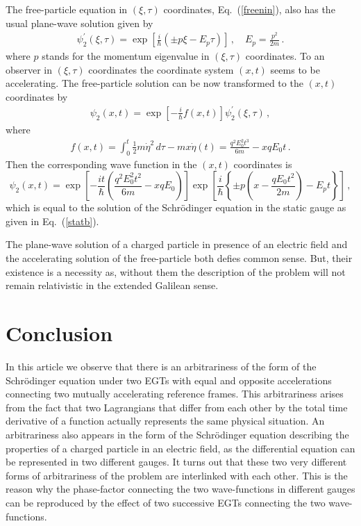 \documentclass[12pt]{article}
\begin{document}
The free-particle equation in $(\xi,\tau)$ coordinates, Eq.~(\ref{freenin}),
also has the usual plane-wave solution given by
%
\begin{eqnarray}
\psi_2^\prime(\xi,\tau)=
\exp\left[\frac{i}{\hbar}(\pm p\xi - E_p
  \tau)\right]\,,\,\,\,\,\,\,E_p=\frac{p^2}{2m}\,.
\end{eqnarray}
%
where $p$ stands for the momentum eigenvalue in $(\xi,\tau)$
coordinates.  To an observer in $(\xi,\tau)$ coordinates the
coordinate system $(x,t)$ seems to be accelerating. The free-particle
solution can be now transformed to the $(x,t)$ coordinates by
%
\begin{eqnarray}
\psi_2(x,t)=\exp\left[-\frac{i}{\hbar}f(x,t)\right]
\psi_2^\prime(\xi,\tau)\,,
\label{coor_gauge2} 
\end{eqnarray}
%
where 
%
\begin{eqnarray}
f(x, t)=\int_0^t \frac12
m\dot{\eta}^2\,d\tau - mx\dot{\eta}(t) = \frac{q^2E_0^2t^3}{6m} - xqE_0t\,.
\label{fxt}
\end{eqnarray}
%
Then the corresponding wave function in the $(x,t)$ coordinates is
$$\psi_2(x,t)=\exp\left[-\frac{it}{\hbar}\left(\frac{q^2E_0^2t^2}{6m} -
  xqE_0\right)\right]\exp\left[\frac{i}{\hbar}\left\{\pm p\left(x -
  \frac{qE_0t^2}{2m}\right) - E_p t\right\}\right]\,,$$ which is equal
to the solution of the Schr\"{o}dinger equation in the static gauge as
given in Eq.~(\ref{statb}). 

The plane-wave solution of a charged particle in presence of an electric field
and the accelerating solution of the free-particle both defies common sense.
But, their existence is a necessity as, without them the description of the
problem will not remain relativistic in the extended Galilean sense.  
\section{Conclusion}
\label{concl}
In this article we observe that there is an arbitrariness of the form of the
Schr\"{o}dinger equation under two EGTs with equal and opposite accelerations
connecting two mutually accelerating reference frames. This arbitrariness
arises from the fact that two Lagrangians that differ from each other by the
total time derivative of a function actually represents the same physical
situation.  An arbitrariness also appears in the form of the Schr\"{o}dinger
equation describing the properties of a charged particle in an electric field,
as the differential equation can be represented in two different gauges. It
turns out that these two very different forms of arbitrariness of the problem
are interlinked with each other. This is the reason why the phase-factor
connecting the two wave-functions in different gauges can be reproduced by the
effect of two successive EGTs connecting the two wave-functions. 
\end{document}
